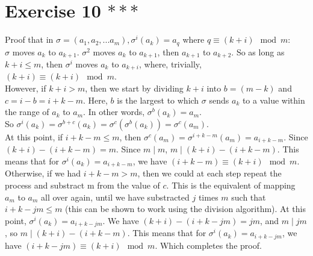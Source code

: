 \documentclass[12pt]{article}
\begin{document}
    \section*{Exercise 10 $***$}
    Proof that in $\sigma = (a_1, a_2, ... a_m), \sigma^i(a_k) = a_q$
    where $q \equiv (k + i) \mod m$: \\
    $\sigma$ moves $a_k$ to $a_{k+1}$.
    $\sigma^2$ moves $a_k$ to $a_{k+1}$, then $a_{k+1}$ to $a_{k+2}$.
    So as long as $k + i \leqslant m$,
    then $\sigma^i$ moves $a_k$ to $a_{k+i}$,
    where, trivially, $(k + i) \equiv (k + i) \mod m$. \\
    However, if $k + i > m$,
    then we start by dividing $k + i$ into $b = (m - k)$
    and $c = i - b = i + k - m$.
    Here, $b$ is the largest to which $\sigma$ sends $a_k$ to a value 
    within the range of $a_k$ to $a_m$.
    In other words, $\sigma^b(a_k) = a_m$. \\
    So $\sigma^i(a_k) = \sigma^{b + c}(a_k)
    = \sigma^c(\sigma^b(a_k))
    = \sigma^c(a_m)$. \\
    At this point, if $i + k - m \leqslant m$,
    then $\sigma^c(a_m) = \sigma^{i + k - m}(a_m) = a_{i + k - m}$.
    Since $(k + i) - (i + k - m) = m$.
    Since $m \mid m$, $m \mid (k + i) - (i + k - m)$.
    This means that for $\sigma^i(a_k) = a_{i + k - m}$,
    we have $(i + k - m) \equiv (k + i) \mod m$.
    Otherwise, if we had $i + k - m > m$,
    then we could at each step repeat the process and substract m from
    the value of $c$.
    This is the equivalent of mapping $a_m$ to $a_m$ all over again,
    until we have substracted $j$ times $m$ such that $i + k - jm \leqslant m$
    (this can be shown to work using the division algorithm).
    At this point, $\sigma^i(a_k) = a_{i + k - jm}$.
    We have $(k + i) - (i + k - jm) = jm$,
    and $m \mid jm$,
    so $m \mid (k + i) - (i + k - m)$.
    This means that for $\sigma^i(a_k) = a_{i + k - jm}$,
    we have $(i + k - jm) \equiv (k + i) \mod m$.
    Which completes the proof.
\end{document}

